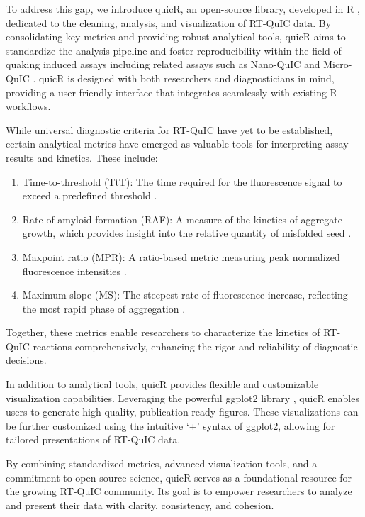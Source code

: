 \documentclass[preprint,12pt, a4paper]{elsarticle}
\begin{document}
    To address this gap, we introduce quicR, an open-source library, developed in R \cite{R2024}, dedicated to the cleaning, analysis, and visualization of RT-QuIC data. By consolidating key metrics and providing robust analytical tools, quicR aims to standardize the analysis pipeline and foster reproducibility within the field of quaking induced assays including related assays such as Nano-QuIC \cite{Christenson2023} and Micro-QuIC \cite{Lee2024}. quicR is designed with both researchers and diagnosticians in mind, providing a user-friendly interface that integrates seamlessly with existing R workflows.

    While universal diagnostic criteria for RT-QuIC have yet to be established, certain analytical metrics have emerged as valuable tools for interpreting assay results and kinetics. These include:

    \begin{enumerate}
        \item Time-to-threshold (TtT): The time required for the fluorescence signal to exceed a predefined threshold \cite{Orru2015}.
        \item Rate of amyloid formation (RAF): A measure of the kinetics of aggregate growth, which provides insight into the relative quantity of misfolded seed \cite{Gallups2022}.
        \item Maxpoint ratio (MPR): A ratio-based metric measuring peak normalized fluorescence intensities \cite{Rowden2023}.
        \item Maximum slope (MS): The steepest rate of fluorescence increase, reflecting the most rapid phase of aggregation \cite{Henderson2015}.
    \end{enumerate}

    Together, these metrics enable researchers to characterize the kinetics of RT-QuIC reactions comprehensively, enhancing the rigor and reliability of diagnostic decisions.

    In addition to analytical tools, quicR provides flexible and customizable visualization capabilities. Leveraging the powerful ggplot2 library \cite{ggplot2016}, quicR enables users to generate high-quality, publication-ready figures. These visualizations can be further customized using the intuitive `+' syntax of ggplot2, allowing for tailored presentations of RT-QuIC data.

    By combining standardized metrics, advanced visualization tools, and a commitment to open source science, quicR serves as a foundational resource for the growing RT-QuIC community. Its goal is to empower researchers to analyze and present their data with clarity, consistency, and cohesion.
\end{document}
